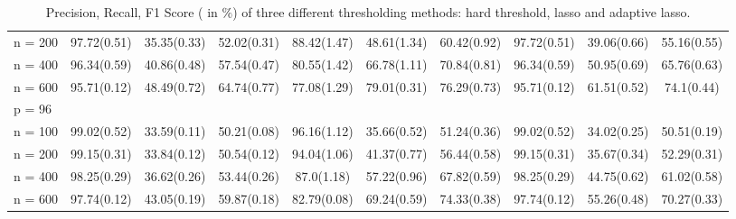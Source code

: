 \begin{sidewaystable}
\begin{tabular}{l@{\hskip 0.4in} ccc ccc ccc}
\multicolumn{1}{r}{n = 200}&97.72(0.51)&35.35(0.33)&52.02(0.31)&88.42(1.47)&48.61(1.34)&60.42(0.92)&97.72(0.51)&39.06(0.66)&55.16(0.55)\\
\multicolumn{1}{r}{n = 400}&96.34(0.59)&40.86(0.48)&57.54(0.47)&80.55(1.42)&66.78(1.11)&70.84(0.81)&96.34(0.59)&50.95(0.69)&65.76(0.63)\\
\multicolumn{1}{r}{n = 600}&95.71(0.12)&48.49(0.72)&64.74(0.77)&77.08(1.29)&79.01(0.31)&76.29(0.73)&95.71(0.12)&61.51(0.52)&74.1(0.44)\\
 p = 96 & & & & & & & & & \\
\multicolumn{1}{r}{n = 100}&99.02(0.52)&33.59(0.11)&50.21(0.08)&96.16(1.12)&35.66(0.52)&51.24(0.36)&99.02(0.52)&34.02(0.25)&50.51(0.19)\\
\multicolumn{1}{r}{n = 200}&99.15(0.31)&33.84(0.12)&50.54(0.12)&94.04(1.06)&41.37(0.77)&56.44(0.58)&99.15(0.31)&35.67(0.34)&52.29(0.31)\\
\multicolumn{1}{r}{n = 400}&98.25(0.29)&36.62(0.26)&53.44(0.26)&87.0(1.18)&57.22(0.96)&67.82(0.59)&98.25(0.29)&44.75(0.62)&61.02(0.58)\\
\multicolumn{1}{r}{n = 600}&97.74(0.12)&43.05(0.19)&59.87(0.18)&82.79(0.08)&69.24(0.59)&74.33(0.38)&97.74(0.12)&55.26(0.48)&70.27(0.33)\\
\end{tabular}
\label{table:precision-homogeneous-final}
\caption{Precision, Recall, F1 Score ( in $\%$) of three different thresholding methods: hard threshold, lasso and adaptive lasso. }%
\end{sidewaystable}